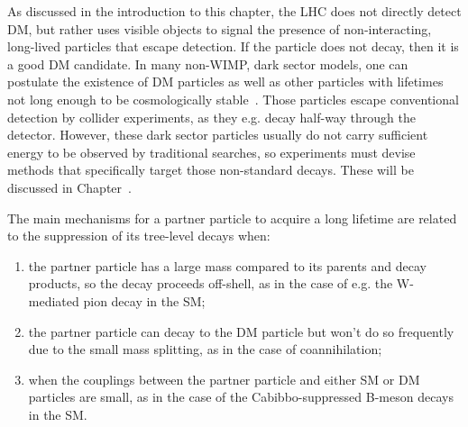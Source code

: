 As discussed in the introduction to this chapter, the LHC does not directly detect DM, but rather uses visible objects to signal the presence of non-interacting, long-lived particles that escape detection. If the particle does not decay, then it is a good DM candidate. In many non-WIMP, dark sector models, one can postulate the existence of DM particles as well as other particles with lifetimes not long enough to be cosmologically stable~\cite{Strassler:2006im}. Those particles escape conventional detection by collider experiments, as they e.g. decay half-way through the detector.
However, these dark sector particles usually do not carry sufficient energy to be observed by traditional searches, so experiments must devise methods that specifically target those non-standard decays. These will be discussed in Chapter~\cite{sec:03_ExperimentalResults}.

The main mechanisms for a partner particle to acquire a long lifetime are related to the suppression of its tree-level decays when:
\begin{enumerate}
\item the partner particle has a large mass compared to its parents and decay products, so the decay proceeds off-shell, as in the case of e.g. the W-mediated pion decay in the SM;
\item the partner particle can decay to the DM particle but won't do so frequently due to the small mass splitting, as in the case of coannihilation;
\item when the couplings between the partner particle and either SM or DM particles are small, as in the case of the Cabibbo-suppressed B-meson decays in the SM. 
\end{enumerate}

